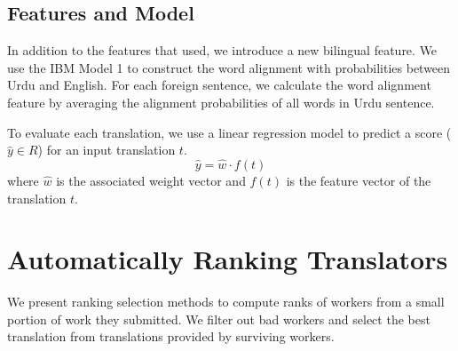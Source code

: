 \documentclass[11pt,letterpaper]{article}
\begin{document}
\subsection{Features and Model}
In addition to the features that \cite{zaidan-callisonburch:2011:ACL-HLT2011a} used, we introduce a new bilingual feature. We use the IBM Model 1 to construct the word alignment with probabilities between Urdu and English. For each foreign sentence, we calculate the word alignment feature by averaging the alignment probabilities of all words in Urdu sentence.

To evaluate each translation, we use a linear regression model to predict a score  ($ \hat{y} \in R$) for an input translation $t$.
\[ \hat{y} = \hat{w}  \cdot f(t) \]
  where $\hat{w}$ is the associated weight vector and $f(t)$ is the feature vector of the translation $t$. 

\section{Automatically Ranking Translators}

We present ranking selection methods to compute ranks of workers from a small portion of work they submitted. We filter out bad workers and select the best translation from translations provided by  surviving workers.
\end{document}
